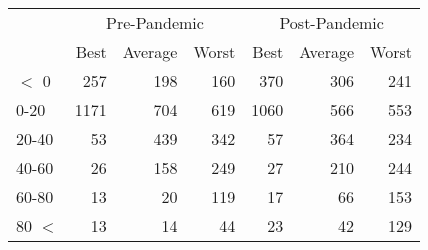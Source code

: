 
\begin{tabular}[t]{lrrrrrr}
\toprule
\multicolumn{1}{c}{ } & \multicolumn{3}{c}{Pre-Pandemic} & \multicolumn{3}{c}{Post-Pandemic} \\
\cmidrule(l{3pt}r{3pt}){2-4} \cmidrule(l{3pt}r{3pt}){5-7}
 & Best & Average & Worst & Best & Average & Worst\\
\midrule
$<$ 0 & 257 & 198 & 160 & 370 & 306 & 241\\
0-20 & 1171 & 704 & 619 & 1060 & 566 & 553\\
20-40 & 53 & 439 & 342 & 57 & 364 & 234\\
40-60 & 26 & 158 & 249 & 27 & 210 & 244\\
60-80 & 13 & 20 & 119 & 17 & 66 & 153\\
80 $<$ & 13 & 14 & 44 & 23 & 42 & 129\\
\bottomrule
\end{tabular}
